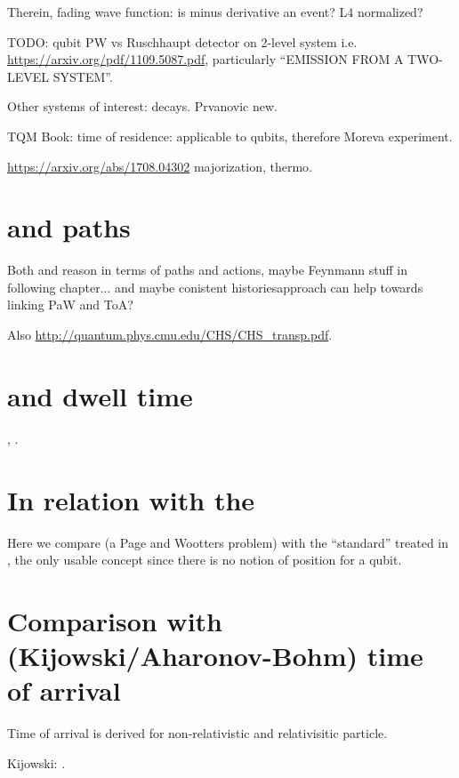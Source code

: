 Therein, fading wave function: is minus derivative an event?
L4 normalized?

TODO: qubit PW vs Ruschhaupt detector on 2-level system  i.e. \url{https://arxiv.org/pdf/1109.5087.pdf},
particularly ``EMISSION FROM A TWO-LEVEL SYSTEM''.

Other systems of interest: decays. Prvanovic new.

TQM Book: time of residence: applicable to qubits, therefore Moreva experiment.

\url{https://arxiv.org/abs/1708.04302} majorization, thermo.



\section{and paths}

Both \cite{YearsleyHalliwell_Clocks} and \cite{Gambini_PW}
reason in terms of paths and actions, maybe Feynmann stuff
in following chapter... and maybe conistent historiesapproach can help
towards linking PaW and ToA?

Also \url{http://quantum.phys.cmu.edu/CHS/CHS_transp.pdf}.

\section{and dwell time}

\cite[\S 5]{TQM2}, \cite{YearsleyHalliwell_Clocks}.

\section{In relation with the }

Here we compare \cite{Moreva:synthetic, Moreva:illustration}
(a Page and Wootters problem)
with the ``standard'' 
treated in \cite[\S 5.5.2]{TQM2},
the only usable concept since there is no notion of position
for a qubit.

\section{Comparison with (Kijowski/Aharonov-Bohm) time of arrival}

Time of arrival is derived for non-relativistic \parencite{Delgado_TOA, Delgado_TOA2}
and relativisitic \parencite{Leon_TOA_R}
particle.

Kijowski: \cite{Kijowski_Time, Kijowski_Comment}.

